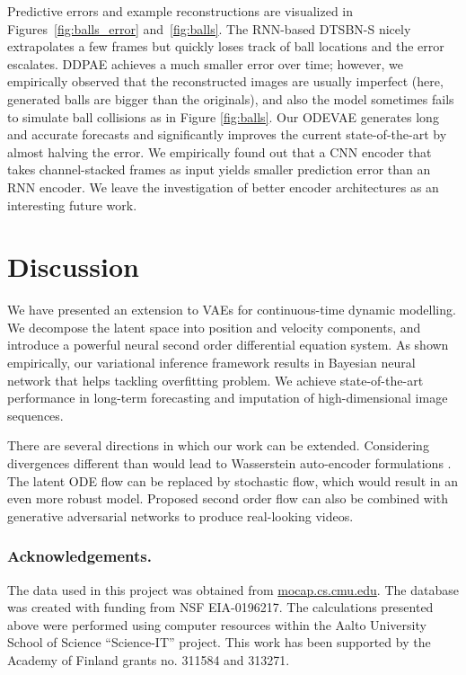 \documentclass{article}
\newcommand{\0}{\mathbf{0}}
\begin{document}
Predictive errors and example reconstructions are visualized in Figures~\ref{fig:balls_error} and~\ref{fig:balls}. The RNN-based DTSBN-S nicely extrapolates a few frames but quickly loses track of ball locations and the error escalates. DDPAE achieves a much smaller error over time; however, we empirically observed that the reconstructed images are usually imperfect (here, generated balls are bigger than the originals), and also the model sometimes fails to simulate ball collisions as in Figure \ref{fig:balls}. Our ODEVAE generates long and accurate forecasts and significantly improves the current state-of-the-art by almost halving the error. We empirically found out that a CNN encoder that takes channel-stacked frames as input yields smaller prediction error than an RNN encoder. We leave the investigation of better encoder architectures as an interesting future work.

\section{Discussion}
We have presented an extension to VAEs for continuous-time dynamic modelling. We decompose the latent space into position and velocity components, and introduce a powerful neural second order differential equation system. As shown empirically, our variational inference framework results in Bayesian neural network that helps tackling overfitting problem. We achieve state-of-the-art performance in long-term forecasting and imputation of high-dimensional image sequences. 

There are several directions in which our work can be extended. Considering divergences different than  would lead to Wasserstein auto-encoder formulations \citep{tolstikhin2017wasserstein}. The latent ODE flow can be replaced by stochastic flow, which would result in an even more robust model. Proposed second order flow can also be combined with generative adversarial networks to produce real-looking videos.











\subsubsection*{Acknowledgements.} 
The data used in this project was obtained from \url{mocap.cs.cmu.edu}. The database was created with funding from NSF EIA-0196217. The calculations presented above were performed using computer resources within the Aalto University School of Science “Science-IT” project. This work has been supported by the Academy of Finland grants no. 311584 and 313271.
\end{document}
